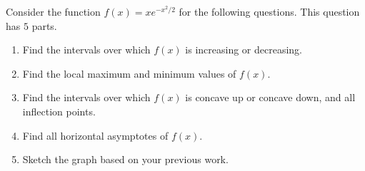 \documentclass[../main.tex]{subfiles}
\begin{document}
\begin{exercise}
  Consider the function \(f(x) = xe^{-x^{2}/2}\) for the following questions. This question has \(5\) parts.

  \begin{enumerate}[label=(\alph*)]
    \item Find the intervals over which \(f(x)\) is increasing or decreasing.

      \blanks*

    \item Find the local maximum and minimum values of \(f(x)\).

      \blanks*
      \clearpage

    \item Find the intervals over which \(f(x)\) is concave up or concave down, and all inflection points.

      \blanks*

    \item Find all horizontal asymptotes of \(f(x)\).

      \blanks*
      \clearpage

    \item Sketch the graph based on your previous work.

      \begin{center}
        
      \end{center}
  \end{enumerate}
\end{exercise}
\clearpage
\end{document}
